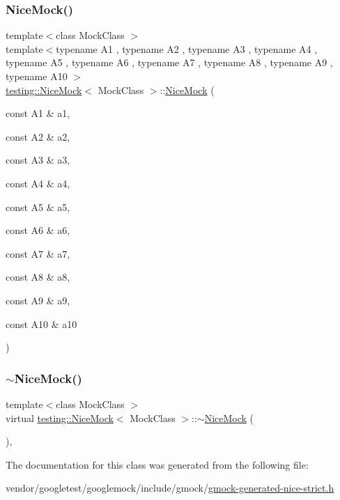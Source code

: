 \mbox{\label{classtesting_1_1_nice_mock_a4baf1da52f4c892fc02f6ba10c0b8c02}} 
\subsubsection{\texorpdfstring{Nice\+Mock()}{NiceMock()}\hspace{0.1cm}{\footnotesize\ttfamily [11/11]}}
{\footnotesize\ttfamily template$<$class Mock\+Class $>$ \\
template$<$typename A1 , typename A2 , typename A3 , typename A4 , typename A5 , typename A6 , typename A7 , typename A8 , typename A9 , typename A10 $>$ \\
\hyperlink{classtesting_1_1_nice_mock}{testing\+::\+Nice\+Mock}$<$ Mock\+Class $>$\+::\hyperlink{classtesting_1_1_nice_mock}{Nice\+Mock} (\begin{DoxyParamCaption}\item[{const A1 \&}]{a1,  }\item[{const A2 \&}]{a2,  }\item[{const A3 \&}]{a3,  }\item[{const A4 \&}]{a4,  }\item[{const A5 \&}]{a5,  }\item[{const A6 \&}]{a6,  }\item[{const A7 \&}]{a7,  }\item[{const A8 \&}]{a8,  }\item[{const A9 \&}]{a9,  }\item[{const A10 \&}]{a10 }\end{DoxyParamCaption})\hspace{0.3cm}{\ttfamily [inline]}}

\mbox{\label{classtesting_1_1_nice_mock_a4aaa6bd3850de6b6baa408010909a25f}} 
\subsubsection{\texorpdfstring{$\sim$\+Nice\+Mock()}{~NiceMock()}}
{\footnotesize\ttfamily template$<$class Mock\+Class $>$ \\
virtual \hyperlink{classtesting_1_1_nice_mock}{testing\+::\+Nice\+Mock}$<$ Mock\+Class $>$\+::$\sim$\hyperlink{classtesting_1_1_nice_mock}{Nice\+Mock} (\begin{DoxyParamCaption}{ }\end{DoxyParamCaption})\hspace{0.3cm}{\ttfamily [inline]}, {\ttfamily [virtual]}}



The documentation for this class was generated from the following file\+:\begin{DoxyCompactItemize}
\item 
vendor/googletest/googlemock/include/gmock/\hyperlink{gmock-generated-nice-strict_8h}{gmock-\/generated-\/nice-\/strict.\+h}\end{DoxyCompactItemize}
